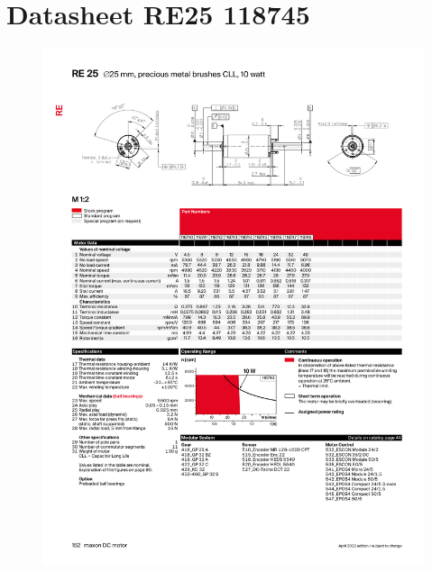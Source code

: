 \documentclass{article}
\begin{document}
\newpage



\newpage
\appendix 

  \section{Datasheet RE25 118745}
    \label{app:datasheet motor}
    \begin{figure}[htbp]
      \centering %
      \includegraphics[page=1, clip, trim=0cm 0cm 0cm 0cm, scale = 0.65]{datasheet_RE25118745.pdf}
    \end{figure}
    \cite{Maxon}

  \newpage
\end{document}
